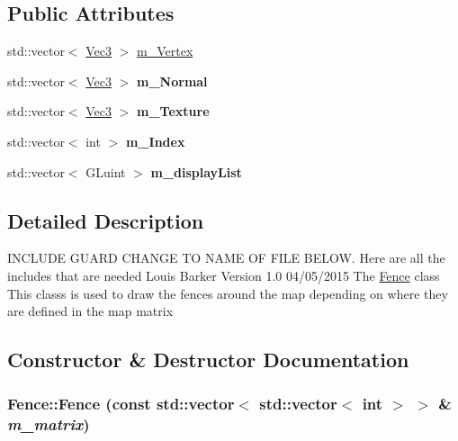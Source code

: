 \subsection*{Public Attributes}
\begin{DoxyCompactItemize}
\item 
std::vector$<$ \hyperlink{classVec3}{Vec3} $>$ \hyperlink{classFence_a4b5ae58d96d77af0de4dfc874a8e4b67}{m\_\-Vertex}
\item 
\hypertarget{classFence_a19de36cf717ada801d47c1482b40a498}{
std::vector$<$ \hyperlink{classVec3}{Vec3} $>$ {\bfseries m\_\-Normal}}
\label{classFence_a19de36cf717ada801d47c1482b40a498}

\item 
\hypertarget{classFence_ac9c16d2a6fc795d857efd4a14405366b}{
std::vector$<$ \hyperlink{classVec3}{Vec3} $>$ {\bfseries m\_\-Texture}}
\label{classFence_ac9c16d2a6fc795d857efd4a14405366b}

\item 
\hypertarget{classFence_a3d5f0771ae268dbd47a55b1431447f81}{
std::vector$<$ int $>$ {\bfseries m\_\-Index}}
\label{classFence_a3d5f0771ae268dbd47a55b1431447f81}

\item 
\hypertarget{classFence_a3a52d46867fdba056f1bd754dc6c9a1a}{
std::vector$<$ GLuint $>$ {\bfseries m\_\-displayList}}
\label{classFence_a3a52d46867fdba056f1bd754dc6c9a1a}

\end{DoxyCompactItemize}


\subsection{Detailed Description}
INCLUDE GUARD CHANGE TO NAME OF FILE BELOW. Here are all the includes that are needed Louis Barker Version 1.0 04/05/2015 The \hyperlink{classFence}{Fence} class This classs is used to draw the fences around the map depending on where they are defined in the map matrix 

\subsection{Constructor \& Destructor Documentation}
\hypertarget{classFence_a0a7cb5b042c919c097ce9f1476447dfa}{
\subsubsection[{Fence}]{\setlength{\rightskip}{0pt plus 5cm}Fence::Fence (const std::vector$<$ std::vector$<$ int $>$ $>$ \& {\em m\_\-matrix})}}
\label{classFence_a0a7cb5b042c919c097ce9f1476447dfa}


